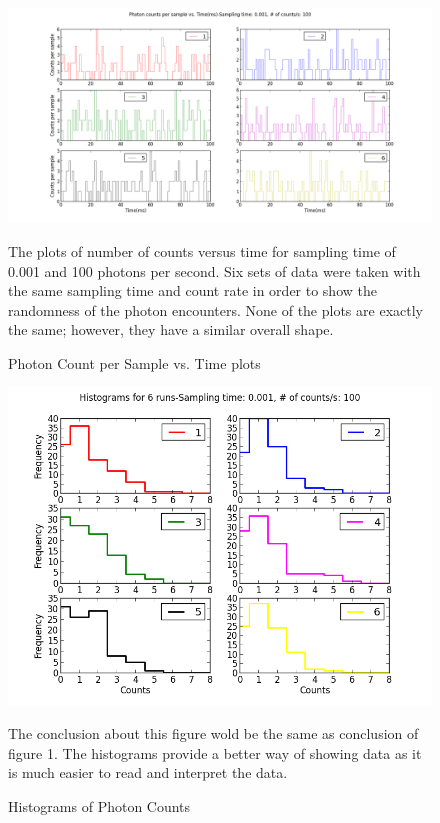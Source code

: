 \documentclass[letterpaper,12pt]{article}
\begin{document}
\begin{figure}
\centering
\includegraphics[scale=0.7]{ex_1_plot_1.png}
\caption{ Photon Count per Sample vs. Time plots}
The plots of number of counts versus time for sampling time of 0.001 and 100 photons per second. Six sets of data were taken with the same sampling time and count rate in order to show the randomness of the photon encounters. None of the plots are exactly the same; however, they have a similar overall shape.
\end{figure}

\begin{figure}[t]
\centering
\includegraphics[scale=0.7]{histograms.png}
\caption{Histograms of Photon Counts}
The conclusion about this figure wold be the same as conclusion of figure 1.  The histograms provide a better way of showing data as it is much easier to read and interpret the data.
\end{figure}
\end{document}
